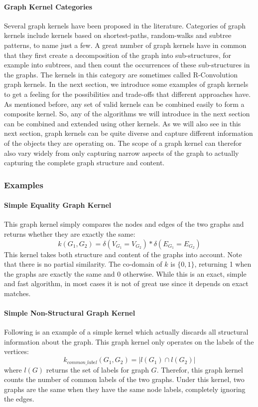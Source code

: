 \paragraph{Graph Kernel Categories}
Several graph kernels have been proposed in the literature.
Categories of graph kernels include kernels based on shortest-paths, random-walks and subtree patterns, to name just a few.
A great number of graph kernels have in common that they first create a decomposition of the graph into sub-structures, for example into subtrees, and then count the occurrences of these sub-structures in the graphs.
The kernels in this category are sometimes called R-Convolution graph kernels.
In the next section, we introduce some examples of graph kernels to get a feeling for the possibilities and trade-offs that different approaches have.
As mentioned before, any set of valid kernels can be combined easily to form a composite kernel.
So, any of the algorithms we will introduce in the next section can be combined and extended using other kernels.
As we will also see in this next section, graph kernels can be quite diverse and capture different information of the objects they are operating on.
The scope of a graph kernel can therefor also vary widely from only capturing narrow aspects of the graph to actually capturing the complete graph structure and content.


\subsubsection{Examples}
\paragraph{Simple Equality Graph Kernel}
This graph kernel simply compares the nodes and edges of the two graphs and returns whether they are exactly the same:
\begin{equation*}
    k(G_1, G_2) = \delta(V_{G_1} = V_{G_2}) * \delta(E_{G_1} = E_{G_2})
\end{equation*}
This kernel takes both structure and content of the graphs into account. Note that there is no partial similarity. The co-domain of $k$ is $\{0, 1\}$, returning 1 when the graphs are exactly the same and 0 otherwise.
While this is an exact, simple and fast algorithm, in most cases it is not of great use since it depends on exact matches.

\paragraph{Simple Non-Structural Graph Kernel}
Following is an example of a simple kernel which actually discards all structural information about the graph. This graph kernel only operates on the labels of the vertices:
\begin{equation*}
k_{common\_label}(G_1, G_2) = | l(G_1) \cap l(G_2) |
\end{equation*}
where $l(G)$ returns the set of labels for graph $G$.
Therefor, this graph kernel counts the number of common labels of the two graphs. Under this kernel, two graphs are the same when they have the same node labels, completely ignoring the edges.

